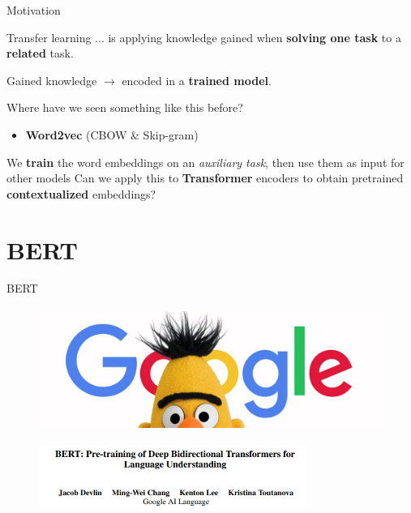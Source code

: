 \documentclass[12pt,aspectratio=169,handout]{beamer}
\begin{document}
\begin{frame}{Motivation}

	\begin{block}{Transfer learning}
		... is applying knowledge gained when \textbf{solving one task} to a \textbf{related} task.

		Gained knowledge $\to$ encoded in a \textbf{trained model}.
	\end{block}

	\pause

	\vspace{1em}
	Where have we seen something like this before?
	\pause
	\begin{itemize}
		\item \textbf{Word2vec} (CBOW \& Skip-gram)
	\end{itemize}
	\pause
	We \textbf{train} the word embeddings on an \textit{auxiliary task}, then use them as input for other models
	\pause
	Can we apply this to \textbf{Transformer} encoders to obtain pretrained \textbf{contextualized} embeddings?

\end{frame}

\section{BERT}

\begin{frame}{BERT}

\begin{center}
	\begin{figure}[h]
		\includegraphics[height=4cm]{bert-google}
	\end{figure}

	\begin{figure}[h]
		\includegraphics[height=2cm]{bert-paper}
	\end{figure}
\end{center}

\end{frame}
\end{document}
